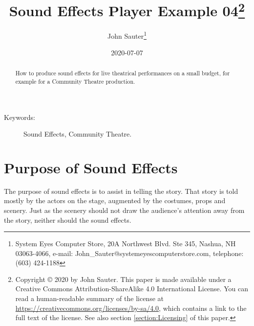 \documentclass[letterpaper,twoside]{article}
\begin{document}
\title{Sound Effects Player Example 04\footnote{Copyright
    {\copyright} 2020 by John Sauter.
    This paper is made available under a
    Creative Commons Attribution-ShareAlike 4.0 International License.
    You can read a human-readable summary of the license at
    \url{https://creativecommons.org/licenses/by-sa/4.0}, which contains
    a link to the full text of the license.
    See also section \ref{section:Licensing} of this paper.}
}
\author{John Sauter\footnote{
    System Eyes Computer Store,
    20A Northwest Blvd.  Ste 345,
    Nashua, NH  03063-4066,
    e-mail: John\_Sauter@systemeyescomputerstore.com,
    telephone: (603) 424-1188}}
\date{2020-07-07}
\maketitle
\begin{abstract}
  How to produce sound effects for live theatrical performances
  on a small budget,
  for example for a Community Theatre production.
\end{abstract}
\begin{description}
\item[Keywords:]Sound Effects, Community Theatre.
\end{description}
  
\newpage
\section{Purpose of Sound Effects}
The purpose of sound effects is to assist in telling the story.
That story is told mostly by the actors on the stage, augmented
by the costumes, props and scenery.  Just as the scenery should
not draw the audience's attention away from the story, neither
should the sound effects.
\end{document}

